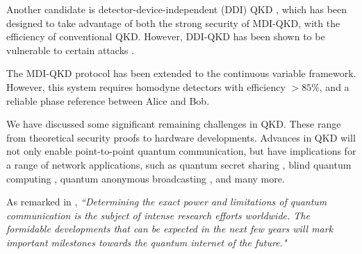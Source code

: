Another candidate is detector-device-independent (DDI) QKD \cite{bib:lim2014detector, bib:PhysRevA.92.022337}, which has been designed to take advantage of both the strong security of MDI-QKD, with the efficiency of conventional QKD. However, DDI-QKD has been shown to be vulnerable to certain attacks \cite{bib:PhysRevLett.117.250505}. 

The MDI-QKD protocol has been extended to the continuous variable framework. However, this system requires homodyne detectors with efficiency $>85\%$, and a reliable phase reference between Alice and Bob.  

We have discussed some significant remaining challenges in QKD. These range from theoretical security proofs to hardware developments. Advances in QKD will not only enable point-to-point quantum communication, but have implications for a range of network applications, such as quantum secret sharing \cite{bib:cleve1999share, bib:PhysRevA.61.042311, bib:PhysRevA.71.044301}, blind quantum computing \cite{bib:broadbent2009universal, bib:barz2012demonstration}, quantum anonymous broadcasting \cite{bib:christandl2005quantum}, and many more.

As remarked in \cite{bib:diamanti2016practical}, \textit{``Determining the exact power and limitations of quantum communication is the subject of intense research efforts worldwide. The formidable developments that can be expected in the next few years will mark important milestones towards the quantum internet of the future."}